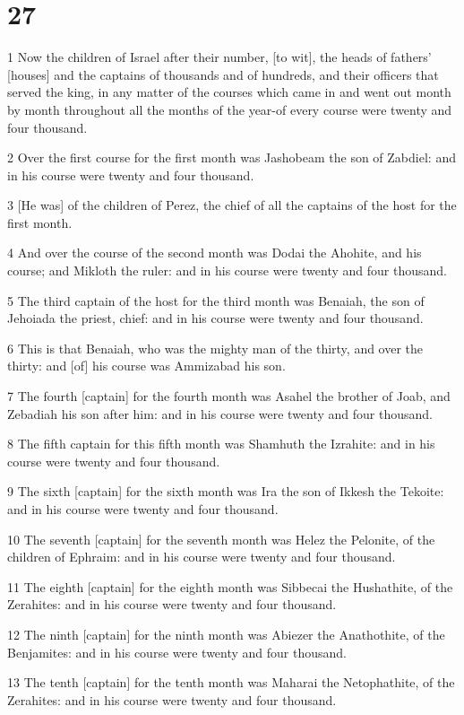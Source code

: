 \chapter{27}

\par 1 Now the children of Israel after their number, [to wit], the heads of fathers' [houses] and the captains of thousands and of hundreds, and their officers that served the king, in any matter of the courses which came in and went out month by month throughout all the months of the year-of every course were twenty and four thousand.
\par 2 Over the first course for the first month was Jashobeam the son of Zabdiel: and in his course were twenty and four thousand.
\par 3 [He was] of the children of Perez, the chief of all the captains of the host for the first month.
\par 4 And over the course of the second month was Dodai the Ahohite, and his course; and Mikloth the ruler: and in his course were twenty and four thousand.
\par 5 The third captain of the host for the third month was Benaiah, the son of Jehoiada the priest, chief: and in his course were twenty and four thousand.
\par 6 This is that Benaiah, who was the mighty man of the thirty, and over the thirty: and [of] his course was Ammizabad his son.
\par 7 The fourth [captain] for the fourth month was Asahel the brother of Joab, and Zebadiah his son after him: and in his course were twenty and four thousand.
\par 8 The fifth captain for this fifth month was Shamhuth the Izrahite: and in his course were twenty and four thousand.
\par 9 The sixth [captain] for the sixth month was Ira the son of Ikkesh the Tekoite: and in his course were twenty and four thousand.
\par 10 The seventh [captain] for the seventh month was Helez the Pelonite, of the children of Ephraim: and in his course were twenty and four thousand.
\par 11 The eighth [captain] for the eighth month was Sibbecai the Hushathite, of the Zerahites: and in his course were twenty and four thousand.
\par 12 The ninth [captain] for the ninth month was Abiezer the Anathothite, of the Benjamites: and in his course were twenty and four thousand.
\par 13 The tenth [captain] for the tenth month was Maharai the Netophathite, of the Zerahites: and in his course were twenty and four thousand.
